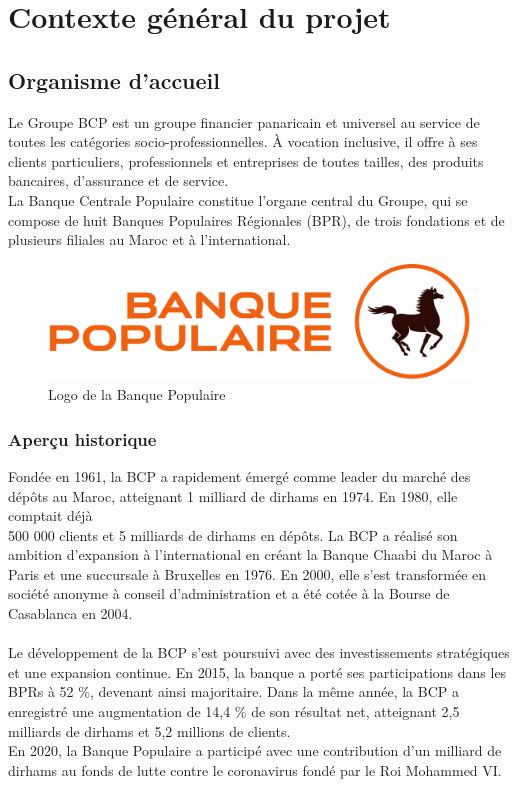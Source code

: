 \chapter{Contexte général du projet}


\section{Organisme d’accueil}


Le Groupe BCP est un groupe financier panaricain et universel au service de toutes les catégories socio-professionnelles. À vocation inclusive, il offre à ses clients particuliers, professionnels et entreprises de toutes tailles, des produits bancaires, d’assurance et de service. \\
La Banque Centrale Populaire constitue l’organe central du Groupe, qui se compose de huit Banques Populaires Régionales (BPR), de trois fondations et de plusieurs filiales au Maroc et à l’international.

\begin{figure}[H]
    \centering
    \includegraphics[width=.75\textwidth]{logos/BCP.png}
    \caption{Logo de la Banque Populaire}
\end{figure}

\subsection{Aperçu historique}
Fondée en 1961, la BCP a rapidement émergé comme leader du marché des dépôts au Maroc, atteignant 1 milliard de dirhams en 1974. En 1980, elle comptait déjà  \\ 500 000 clients et 5 milliards de dirhams en dépôts. La BCP a réalisé son ambition d’expansion à l’international en créant la Banque Chaabi du Maroc à Paris et une succursale à Bruxelles en 1976. En 2000, elle s'est transformée en société anonyme à conseil d'administration et a été cotée à la Bourse de Casablanca en 2004.
\\ \\
Le développement de la BCP s'est poursuivi avec des investissements stratégiques et une expansion continue. En 2015, la banque a porté ses participations dans les BPRs à 52 \%, devenant ainsi majoritaire. Dans la même année, la BCP a enregistré une augmentation de 14,4 \% de son résultat net, atteignant 2,5 milliards de dirhams et 5,2 millions de clients.  \\  
En 2020, la Banque Populaire a participé  avec une contribution d'un milliard de dirhams au fonds de lutte contre le coronavirus fondé par le Roi Mohammed VI. 


